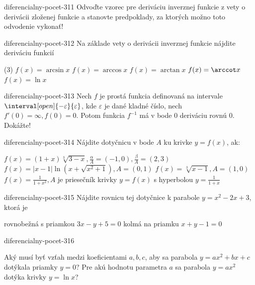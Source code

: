 \begin{defproblem}{diferencialny-pocet-311}
Odvoďte vzorec pre deriváciu inverznej funkcie z vety o derivácii zloženej
funkcie a stanovte predpoklady, za ktorých možno toto odvodenie vykonať!
\end{defproblem}

\begin{defproblem}{diferencialny-pocet-312}
Na základe vety o derivácii inverznej funkcie nájdite deriváciu funkcií
\begin{tasks}(3)
  \task $f(x)=\arcsin x$
  \task $f(x)=\arccos x$
  \task $f(x)=\arctan x$
  \task $f(x)=\arccot x$
  \task $f(x)=\ln x$
\end{tasks}
\end{defproblem}

\begin{defproblem}{diferencialny-pocet-313}
Nech $f$ je prostá funkcia definovaná na intervale
$\interval[open]{-\varepsilon}{\varepsilon}$, kde $\varepsilon$ je dané kladné
číslo, nech $f'(0)=\infty,f(0)=0$. Potom funkcia $f^{-1}$ má v bode $0$
deriváciu rovnú $0$. Dokážte!
\end{defproblem}

\begin{defproblem}{diferencialny-pocet-314}
Nájdite dotyčnicu v bode $A$ ku krivke $y=f(x)$, ak:
\begin{tasks}
\task
  $f(x)=(1+x)\sqrt[3]{3-x},\frac{\alpha}{A}=(-1,0),\frac{\beta}{A}=(2,3)$
\task
  $f(x)=|x-1|\ln (x+\sqrt{x^2+1}),A=(0,1)$
\task
  $f(x)=\sqrt[3]{x-1},A=(1,0)$
\task
  $f(x)=\frac{1}{1+x^2},A$ je priesečník krivky $y=f(x)$ s hyperbolou
  $y=\frac{1}{1+x}$
\end{tasks}
\end{defproblem}

\begin{defproblem}{diferencialny-pocet-315}
Nájdite rovnicu tej dotyčnice k parabole $y=x^2-2x+3$, ktorá je
\begin{tasks}
\task rovnobežná s priamkou $3x-y+5=0$
\task kolmá na priamku $x+y-1=0$
\end{tasks}
\end{defproblem}

\begin{defproblem}{diferencialny-pocet-316}
\begin{tasks}
\task
  Aký musí byť vzťah medzi koeficientami $a,b,c$, aby sa parabola $y=ax^2+bx+c$
  dotýkala priamky $y=0$?
\task
  Pre akú hodnotu parametra $a$ sa parabola $y=ax^2$ dotýka krivky $y=\ln x$?
\end{tasks}
\end{defproblem}


